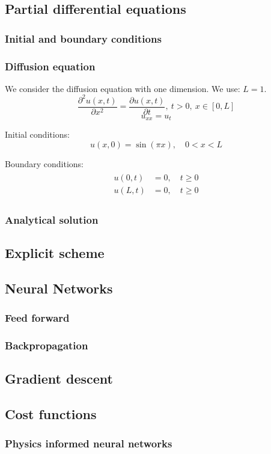 \subsection{Partial differential equations}

\subsubsection{Initial and boundary conditions}

\subsubsection{Diffusion equation}
We consider the diffusion equation with one dimension.
We use: $L = 1$.
\begin{equation}
    \frac{\partial^2 u(x,t)}{\partial x^2}  =\frac{\partial u(x,t)}{\partial t}, \ t>0, \ x\in [0, L]
\end{equation}
\begin{equation}
    u_{xx} = u_t
\end{equation}

Initial conditions:
\begin{equation}
    u(x, 0) = \sin(\pi x), \quad 0 < x < L
\end{equation}

Boundary conditions:
\begin{align}
\begin{split}
    u(0,t) &= 0, \quad t\geq 0 \\
    u(L,t) &= 0, \quad t\geq 0
\end{split}
\end{align}

\subsubsection{Analytical solution}

\subsection{Explicit scheme}

\subsection{Neural Networks}

\subsubsection{Feed forward}

\subsubsection{Backpropagation}

\subsection{Gradient descent}

\subsection{Cost functions}

\subsubsection{Physics informed neural networks}